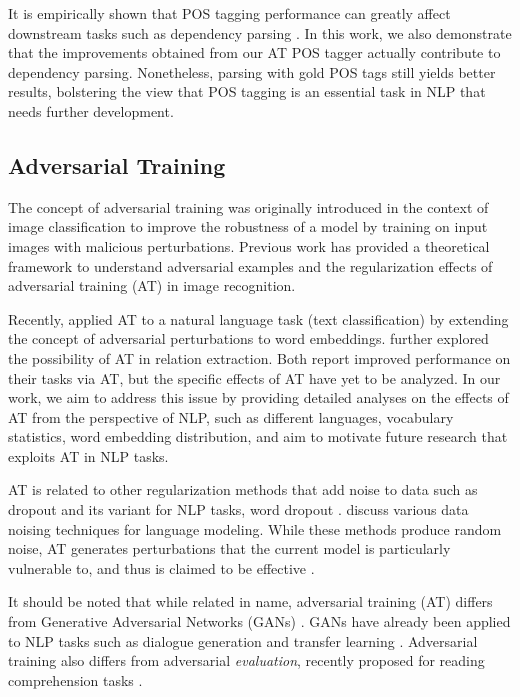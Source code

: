 \documentclass[11pt,a4paper]{article}
\begin{document}
It is empirically shown that POS tagging performance can greatly affect downstream tasks such as dependency parsing \cite{dozat-qi-manning:2017:K17-3}. 
In this work, we also demonstrate that the improvements obtained from our AT POS tagger actually contribute to
dependency parsing. 
Nonetheless, parsing with gold POS tags still yields better results, bolstering the view that POS tagging is an essential task in NLP that needs further development.

\subsection{Adversarial Training}
The concept of adversarial training 
\cite{Szegedy2013,Goodfellow2015explain} was originally introduced in the context of image classification to improve the robustness of a model by training on input images with malicious perturbations.
Previous work
\cite{Goodfellow2015explain,shaham2015understanding,wang2016theoretical} has provided a theoretical framework to understand adversarial examples and the regularization effects of adversarial training (AT) in image recognition.

Recently,  applied AT to a natural language task (text classification)
by extending the concept of adversarial perturbations to word embeddings.
 further explored the possibility of AT in relation extraction.
Both report improved performance on their tasks via AT, but
the specific effects of AT have yet to be analyzed.
In our work, we aim to address this issue by providing detailed analyses on the effects of AT from the perspective of NLP, such as different languages, vocabulary statistics, word embedding distribution, and aim to motivate future research that exploits AT in NLP tasks.

AT is related to other  regularization methods that add noise to data
such as dropout \cite{JMLR:v15:srivastava14a} and its variant for NLP tasks, word dropout \cite{Iyyer:Manjunatha:Boyd-Graber:III-2015}.
 discuss various data noising techniques for language modeling.
While these methods produce random noise, AT generates perturbations that the current model is particularly vulnerable to, and thus is claimed to be effective \cite{Goodfellow2015explain}.

It should be noted that while related in name, adversarial training (AT)
differs from Generative Adversarial Networks (GANs) \cite{goodfellow2014generative}. GANs have already been applied to NLP tasks such as dialogue generation \cite{li2017adversarial} and transfer learning \cite{kim2017cross,gui2017part}. Adversarial training also differs from adversarial \textit{evaluation}, recently proposed for reading comprehension tasks \cite{jia2017adversarial}. 
\end{document}
